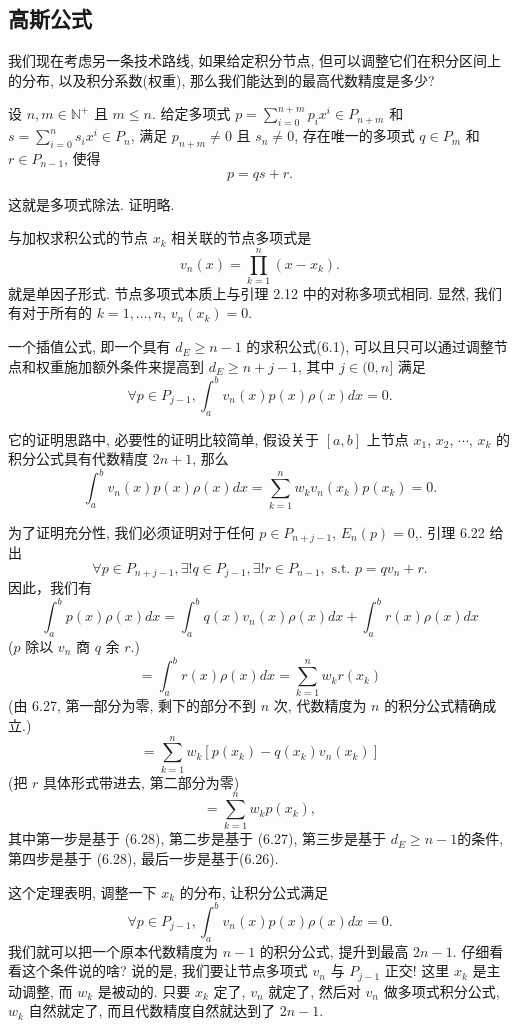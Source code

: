 \documentclass[a4paper]{ctexart}
\newcommand{\hl}[1]
{\noindent {\bf {#1}}}
\begin{document}
{\subsection{高斯公式}

我们现在考虑另一条技术路线, 如果给定积分节点, 但可以调整它们在积分区间上的分布,
以及积分系数(权重), 那么我们能达到的最高代数精度是多少?

\hl{引理6.22} 设 $n, m \in \mathbb{N}^+$ 且 $m \leq n$. 
给定多项式 $p = \sum_{i=0}^{n+m} p_i x^i \in P_{n + m}$ 和 
$s = \sum_{i=0}^{n} s_i x^i \in P_{n}$, 满足 $p_{n + m} \neq 0$
且 $s_n \neq 0$, 存在唯一的多项式 $q \in P_{m}$ 和 $r \in P_{n - 1}$, 
使得
$$ 
p = qs + r. 
$$

这就是多项式除法. 证明略. 

\hl{定义 6.23} 与加权求积公式的节点 $x_k$ 相关联的节点多项式是
$$ 
v_n(x) = \prod_{k=1}^{n} (x - x_k). 
$$
就是单因子形式. 节点多项式本质上与引理 2.12 中的对称多项式相同. 
显然, 我们有对于所有的 $k = 1, \ldots, n$, $v_n(x_k) = 0$.

\hl{定理6.24} 一个插值公式, 即一个具有 $d_E \geq n - 1$ 的求积公式(6.1), 
可以且只可以通过调整节点和权重施加额外条件来提高到 
$d_E \geq n + j - 1$, 其中 $j \in (0, n]$ 满足
$$ 
\forall p \in P_{j-1}, \int_{a}^{b} v_n(x)p(x)\rho(x)dx = 0. 
$$ 

它的证明思路中, 必要性的证明比较简单, 
假设关于 $[a, b]$ 上节点 $x_1$, $x_2$, $\cdots$, $x_k$ 
的积分公式具有代数精度 $2n + 1$, 那么
$$ 
\int_{a}^{b} v_n(x)p(x)\rho(x)dx = \sum_{k=1}^{n} w_k v_n(x_k) p(x_k) = 0. 
$$

为了证明充分性, 我们必须证明对于任何 $p \in P_{n + j - 1}$, $E_n(p) = 0$,.
引理 6.22 给出
$$ 
\forall p \in P_{n + j - 1}, \exists! q \in P_{j - 1}, \exists! 
r \in P_{n-1}, \text{ s.t. } p = qv_n + r. 
$$
因此，我们有
$$ 
\int_{a}^{b} p(x) \rho(x)dx 
= \int_{a}^{b} q(x) v_n(x) \rho(x)dx + \int_{a}^{b} r(x) \rho(x)dx 
$$
($p$ 除以 $v_n$ 商 $q$ 余 $r$.)
$$ 
= \int_{a}^{b} r(x) \rho(x)dx = \sum_{k=1}^{n} w_k r(x_k) 
$$
(由 6.27, 第一部分为零, 剩下的部分不到 $n$ 次, 代数精度为 $n$ 的积分公式精确成立.)
$$ 
= \sum_{k=1}^{n} w_k [p(x_k) - q(x_k)v_n(x_k)] 
$$
(把 $r$ 具体形式带进去, 第二部分为零)
$$
= \sum_{k=1}^{n} w_k p(x_k),
$$
其中第一步是基于 (6.28), 第二步是基于 (6.27), 第三步是基于 $d_E \geq n - 1$的条件, 
第四步是基于 (6.28), 最后一步是基于(6.26). 

这个定理表明, 调整一下 $x_k$ 的分布, 让积分公式满足
$$ 
\forall p \in P_{j - 1}, \int_{a}^{b} v_n(x)p(x)\rho(x)dx = 0. 
$$
我们就可以把一个原本代数精度为 $n - 1$ 的积分公式, 提升到最高 $2n - 1$. 
仔细看看这个条件说的啥? 说的是, 我们要让节点多项式 $v_n$ 与 $P_{j - 1}$ 正交!
这里 $x_k$ 是主动调整, 而 $w_k$ 是被动的. 只要 $x_k$ 定了, $v_n$ 就定了, 
然后对 $v_n$ 做多项式积分公式, $w_k$ 自然就定了, 而且代数精度自然就达到了 $2n - 1$.

}
\end{document}
